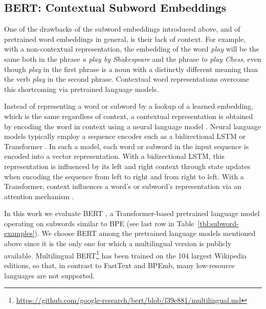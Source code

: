 \documentclass[11pt,a4paper]{article}
\begin{document}
\subsection{BERT: Contextual Subword Embeddings}

One of the drawbacks of the subword embeddings introduced above, and of pretrained word embeddings in general, is their lack of context.
For example, with a non-contextual representation, the embedding of the word \emph{play} will be the same both in the phrase \emph{a play by Shakespeare} and the phrase \emph{to play Chess}, even though \emph{play} in the first phrase is a noun with a distinctly different meaning than the verb \emph{play} in the second phrase.
Contextual word representations \citep{dai2015semi,melamud2016context2vec,ramachandran2017unsupervised,peters2018contextualized,radford2018improving,howard2018universal} overcome this shortcoming via pretrained language models.

Instead of representing a word or subword by a lookup of a learned embedding, which is the same regardless of context, a contextual representation is obtained by encoding the word in context using a neural language model \citep{bengio2003neural}.
Neural language models typically employ a sequence encoder such as a bidirectional LSTM \citep{hochreiter1997long} or Transformer \citep{vaswani2017attention}.
In such a model, each word or subword in the input sequence is encoded into a vector representation.
With a bidirectional LSTM, this representation is influenced by its left and right context through state updates when encoding the sequence from left to right and from right to left.
With a Transformer, context influences a word's or subword's representation via an attention mechanism \citep{bahdanau2014neural}.

In this work we evaluate BERT \citep{devlin2018bert}, a Transformer-based pretrained language model operating on subwords similar to BPE (see last row in Table~\ref{tbl:subword-examples}).
We choose BERT among the pretrained language models mentioned above since it is the only one for which a multilingual version is publicly available.
Multilingual BERT\footnote{\url{https://github.com/google-research/bert/blob/f39e881/multilingual.md}}
has been trained on the 104 largest Wikipedia editions, so that, in contrast to FastText and BPEmb, many low-resource languages are not supported.
\end{document}
